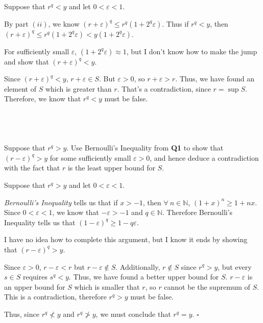 \documentclass[a4paper]{article}
\begin{document}
Suppose that $r^q < y$ and let $0 < \varepsilon < 1$.

By part $(ii)$, we know $(r + \varepsilon)^q \le r^q (1 + 2^q \varepsilon)$. Thus if $r^q < y$, then $(r + \varepsilon)^q \le r^q (1 + 2^q \varepsilon) < y (1 + 2^q \varepsilon)$.

For sufficiently small $\varepsilon$, $(1 + 2^q \varepsilon) \approx 1$, but I don't know how to make the jump and show that $(r + \varepsilon)^q < y$.

Since $(r + \varepsilon)^q < y$, $r + \varepsilon \in S$. But $\varepsilon > 0$, so $r + \varepsilon > r$. Thus, we have found an element of $S$ which is greater than $r$. That's a contradiction, since $r = \sup S$. Therefore, we know that $r^q < y$ must be false.

\subsection{~} %

\begin{questionbody}
Suppose that $r^q > y$. Use Bernoulli’s Inequality from \textbf{Q1} to show that ${(r - \varepsilon)^q} > y$ for some sufficiently small $\varepsilon > 0$, and hence deduce a contradiction with the fact that $r$ is the least upper bound for $S$.
\end{questionbody}

Suppose that $r^q > y$ and let $0 < \varepsilon < 1$.

\textit{Bernoulli's Inequality} tells us that if $x > -1$, then $\forall\ n \in \mathbb N$, $(1 + x)^n \ge 1 + nx$. Since $0 < \varepsilon < 1$, we know that $-\varepsilon > -1$ and $q \in \mathbb N$. Therefore Bernoulli's Inequality tells us that $(1 - \varepsilon)^q \ge 1 - q\varepsilon$.

I have no idea how to complete this argument, but I know it ends by showing that $(r - \varepsilon)^q > y$.

Since $\varepsilon > 0$, $r - \varepsilon < r$ but $r - \varepsilon \notin S$. Additionally, $r \notin S$ since $r^q > y$, but every $s \in S$ requires $s^q < y$. Thus, we have found a better upper bound for $S$. $r - \varepsilon$ is an upper bound for $S$ which is smaller that $r$, so $r$ cannot be the supremum of $S$. This is a contradiction, therefore $r^q > y$ must be false.

Thus, since $r^q \not < y$ and $r^q \not > y$, we must conclude that $r^q = y$. \hfill $\square$
\end{document}
